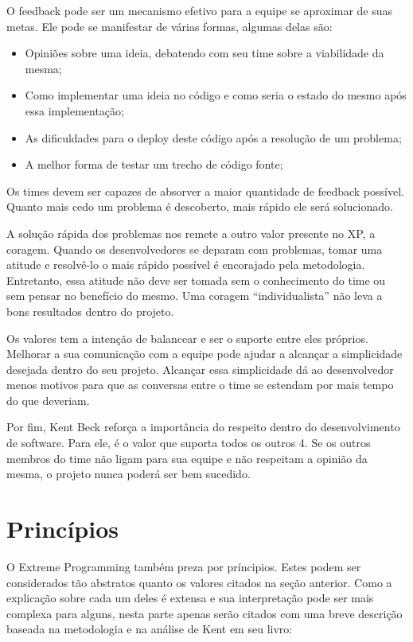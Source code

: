 O feedback pode ser um mecanismo efetivo para a equipe se aproximar de suas metas. Ele pode se manifestar de várias formas, algumas delas são:

\begin{itemize}

\item Opiniões sobre uma ideia, debatendo com seu time sobre a viabilidade da mesma;

\item Como implementar uma ideia no código e como seria o estado do mesmo após essa implementação;

\item As dificuldades para o deploy deste código após a resolução de um problema;

\item A melhor forma de testar um trecho de código fonte;

\end{itemize}

Os times devem ser capazes de absorver a maior quantidade de feedback possível. Quanto mais cedo um problema é descoberto, mais rápido ele será solucionado.

A solução rápida dos problemas nos remete a outro valor presente no XP, a coragem. Quando os desenvolvedores se deparam com problemas, tomar uma atitude e resolvê-lo o mais rápido possível é encorajado pela metodologia. Entretanto, essa atitude não deve ser tomada sem o conhecimento do time ou sem pensar no benefício do mesmo. Uma coragem “individualista” não leva a bons resultados dentro do projeto.

Os valores tem a intenção de balancear e ser o suporte entre eles próprios. Melhorar a sua comunicação com a equipe pode ajudar a alcançar a simplicidade desejada dentro do seu projeto. Alcançar essa simplicidade dá ao desenvolvedor menos motivos para que as conversas entre o time se estendam por mais tempo do que deveriam.

Por fim, Kent Beck reforça a importância do respeito dentro do desenvolvimento de software. Para ele, é o valor que suporta todos os outros 4. Se os outros membros do time não ligam para sua equipe e não respeitam a opinião da mesma, o projeto nunca poderá ser bem sucedido.

\section{Princípios}

O Extreme Programming também preza por príncipios. Estes podem ser considerados tão abstratos quanto os valores citados na seção anterior. Como a explicação sobre cada um deles é extensa e sua interpretação pode ser mais complexa para alguns, nesta parte apenas serão citados com uma breve descrição baseada na metodologia e na análise de Kent em seu livro:

